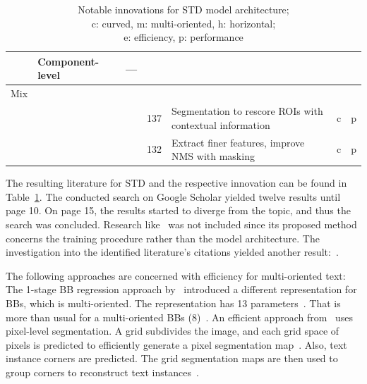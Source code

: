 \begin{table}[ht]
\begin{tabular}{p{}p{}p{}p{}
            p{}p{}p{}}
            & Component-level &~--- & & \\
        \midrule
        Mix & & \\
            & &~\cite{xie_scene_2018} & 137 & Segmentation to rescore \acp{ROI} with
                contextual information & c & p \\
            & &~\cite{dai_fused_2018} & 132 & Extract finer features, improve \ac{NMS} with masking
            & c & p \\
        \bottomrule
    \end{tabular}
    \captionsetup{justification=centering}
    \caption[Notable innovations for STD model architecture]{%
        Notable innovations for STD model architecture; \\
        c: curved, m: multi-oriented, h: horizontal; \\
        e: efficiency, p: performance\label{tb:STD-steps-properties}
    }
\end{table}
The resulting literature for \ac{STD} and the respective innovation can be found in
Table~\ref{tb:STD-steps-properties}.
The conducted search on Google Scholar yielded twelve results until page 10.
On page 15, the results started to diverge from the topic, and thus the search was concluded.
Research like~\cite{xue_accurate_2018} was not included since its proposed method concerns the
training procedure rather than the model architecture.
The investigation into the identified literature's citations yielded another
result:~\cite{ferrari_textsnake_2018}.

The following approaches are concerned with efficiency for multi-oriented text:
The 1-stage \ac{BB} regression approach by~\citep{liao_textboxes_2018} introduced a different
representation for \acp{BB}, which is multi-oriented.
The representation has 13 parameters~\citep{liao_textboxes_2018}.
That is more than usual for a multi-oriented \acp{BB} (8)~\citep{ma_arbitrary-oriented_2018}.
An efficient approach from~\cite{lyu_multi-oriented_2018} uses pixel-level segmentation.
A grid subdivides the image, and each grid space of pixels is
predicted to efficiently generate a pixel segmentation map~\citep{lyu_multi-oriented_2018}.
Also, text instance corners are predicted.
The grid segmentation maps are then used to group corners to reconstruct text
instances~\citep{lyu_multi-oriented_2018}.

